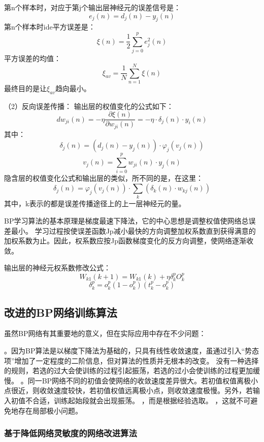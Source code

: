 \documentclass[UTF8]{ctexart}
\begin{document}
第n个样本时，对应于第j个输出层神经元的误差信号是：
$$ e_j(n)=d_{j}(n)-y_j(n) $$
第n个样本时ide平方误差是：
$$ \xi(n)=\frac{1}{2}\sum^{p}_{j=0}e^{2}_{j}(n)  $$
平方误差的均值：
$$ \xi_{av}=\frac{1}{N}\sum^{N}_{n=1}\xi(n) $$
最终目的是让$ \xi_{av} $趋向最小。

（2）反向误差传播：
输出层的权值变化的公式如下：
$$ dw_{ji}(n)=-\eta\frac{\partial\xi(n)}{\partial w_{ji}(n)}=-\eta\cdot\delta_j(n)\cdot y_i(n) $$
其中：
$$ \delta_j(n)=(d_j(n)-y_j(n))\cdot \varphi_j(v_j(n)) $$
$$ v_j(n)=\sum^{p}_{i=0}w_{ji}(n)\cdot y_j(n) $$
隐含层的权值变化公式和输出层的类似，所不同的是，在这里：
$$ \delta_j(n)=\varphi_j(v_j(n))\cdot \sum_k(\delta_k(n)\cdot w_{kj}(n)) $$
其中，k表示的都是误差传播途径上的上一层神经元的量。

BP学习算法的基本原理是梯度最速下降法，它的中心思想是调整权值使网络总误差最小。 学习过程按使误差函数Jp减小最快的方向调整加权系数直到获得满意的加权系数为止。因此，权系数应按Jp函数梯度变化的反方向调整，使网络逐渐收敛。

输出层的神经元权系数修改公式：
$$ W_{k1}(k+1)=W_{k1}(k)+\eta\delta^{p}_{k}O^{p}_{k} $$
$$ \delta^{p}_{k}=o^{p}_{k}(1-o^{p}_{k})(t^{p}_{k}-o^{p}_{k})  $$
\subsection{改进的BP网络训练算法}
虽然BP网络有其重要地的意义，但在实际应用中存在不少问题：
\begin{itemize}
。因为BP算法是以梯度下降法为基础的，只具有线性收敛速度，虽通过引入“势态项”增加了一定程度的二阶信息，但对算法的性质并无根本的改变。
    没有一种选择的规则，若选的过大会使训练的过程引起振荡，若选的过小会使训练的过程更加缓慢。
。同一BP网络不同的初值会使网络的收敛速度差异很大。若初值权值离极小点很近，则收敛速度较快，若初值权值远离极小点，则收敛速度极慢。另外，若输入初值不合适，训练起始段就会出现振荡。
，而是根据经验选取。
，这就不可避免地存在局部极小问题。
\end{itemize}
\subsubsection{基于降低网络灵敏度的网络改进算法}
\end{document}
